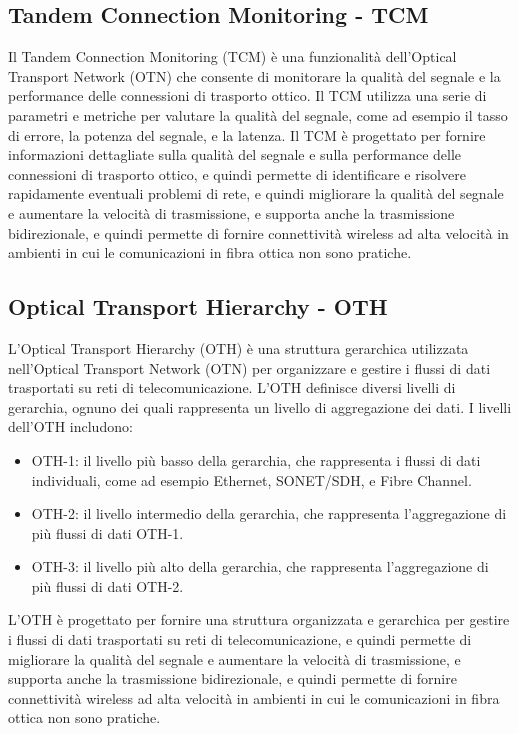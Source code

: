 \subsection{Tandem Connection Monitoring - TCM}
Il Tandem Connection Monitoring (TCM) è una funzionalità dell'Optical Transport Network (OTN) che consente di monitorare la qualità del segnale e la performance delle connessioni di trasporto ottico. Il TCM utilizza una serie di parametri e metriche per valutare la qualità del segnale, come ad esempio il tasso di errore, la potenza del segnale, e la latenza. Il TCM è progettato per fornire informazioni dettagliate sulla qualità del segnale e sulla performance delle connessioni di trasporto ottico, e quindi permette di identificare e risolvere rapidamente eventuali problemi di rete, e quindi migliorare la qualità del segnale e aumentare la velocità di trasmissione, e supporta anche la trasmissione bidirezionale, e quindi permette di fornire connettività wireless ad alta velocità in ambienti in cui le comunicazioni in fibra ottica non sono pratiche.\\

\subsection{Optical Transport Hierarchy - OTH}
L'Optical Transport Hierarchy (OTH) è una struttura gerarchica utilizzata nell'Optical Transport Network (OTN) per organizzare e gestire i flussi di dati trasportati su reti di telecomunicazione. L'OTH definisce diversi livelli di gerarchia, ognuno dei quali rappresenta un livello di aggregazione dei dati. I livelli dell'OTH includono:
\begin{itemize}
    \item OTH-1: il livello più basso della gerarchia, che rappresenta i flussi di dati individuali, come ad esempio Ethernet, SONET/SDH, e Fibre Channel.
    \item OTH-2: il livello intermedio della gerarchia, che rappresenta l'aggregazione di più flussi di dati OTH-1.
    \item OTH-3: il livello più alto della gerarchia, che rappresenta l'aggregazione di più flussi di dati OTH-2.
\end{itemize}
L'OTH è progettato per fornire una struttura organizzata e gerarchica per gestire i flussi di dati trasportati su reti di telecomunicazione, e quindi permette di migliorare la qualità del segnale e aumentare la velocità di trasmissione, e supporta anche la trasmissione bidirezionale, e quindi permette di fornire connettività wireless ad alta velocità in ambienti in cui le comunicazioni in fibra ottica non sono pratiche.\\

